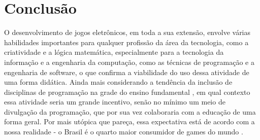 \chapter{Conclusão}
\label{conclusao}
%
O desenvolvimento de jogos eletrônicos, em toda a sua extensão, envolve várias habilidades importantes para qualquer profissão da área da tecnologia, como a criatividade e a lógica matemática, especialmente para a tecnologia da informação e a engenharia da computação, como as técnicas de programação e a engenharia de software, o que confirma a viabilidade do uso dessa atividade de uma forma didática.
Ainda mais considerando a tendência da inclusão de disciplinas de programação na grade do ensino fundamental \nocite{OLHARDIG}, em qual contexto essa atividade seria um grande incentivo, senão no mínimo um meio de divulgação da programação, que por sua vez colaboraria com a educação de uma forma geral. Por mais utópica que pareça, essa expectativa está de acordo com a nossa realidade - o Brasil é o quarto maior consumidor de games do mundo \nocite{ESTADAO}.